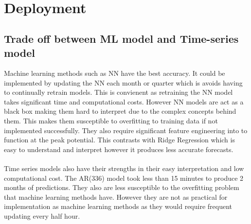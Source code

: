 \documentclass[11pt]{article}
\begin{document}






\section{Deployment}

\subsection{Trade off between ML model and Time-series model}

Machine learning methods such as NN have the best accuracy. It could be implemented by updating the NN each month or quarter which is avoids having to continually retrain models. This is convienent as retraining the NN model takes significant time and computational costs. However NN models are act as a black box making them hard to interpret due to the complex concepts behind them. This makes them susceptible to overfitting to training data if not implemented successfully. They also require significant feature engineering into to function at the peak potential. This contrasts with Ridge Regression which is easy to understand and interpret however it produces less accurate forecasts.
\\
\\
Time series models also have their strengths in their easy interpretation and low computational cost. The AR(336) model took less than 15 minutes to produce 2 months of predictions. They also are less susceptible to the overfitting problem that machine learning methods have. However they are not as practical for implementation as machine learning methods as they would require frequent updating every half hour.
\\
\\
\end{document}
